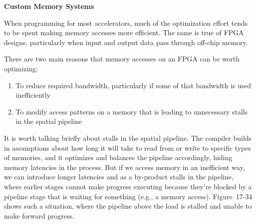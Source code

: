 \hspace*{\fill} \par %
\textbf{Custom Memory Systems}

When programming for most accelerators, much of the optimization effort tends to be spent making memory accesses more efficient. The same is true of FPGA designs, particularly when input and output data pass through off-chip memory.\par

There are two main reasons that memory accesses on an FPGA can be worth optimizing:\par

\begin{enumerate}
	\item To reduce required bandwidth, particularly if some of that bandwidth is used inefficiently
	\item To modify access patterns on a memory that is leading to unnecessary stalls in the spatial pipeline
\end{enumerate}

It is worth talking briefly about stalls in the spatial pipeline. The compiler builds in assumptions about how long it will take to read from or write to specific types of memories, and it optimizes and balances the pipeline accordingly, hiding memory latencies in the process. But if we access memory in an inefficient way, we can introduce longer latencies and as a by-product stalls in the pipeline, where earlier stages cannot make progress executing because they’re blocked by a pipeline stage that is waiting for something (e.g., a memory access). Figure 17-34 shows such a situation, where the pipeline above the load is stalled and unable to make forward progress.\par

